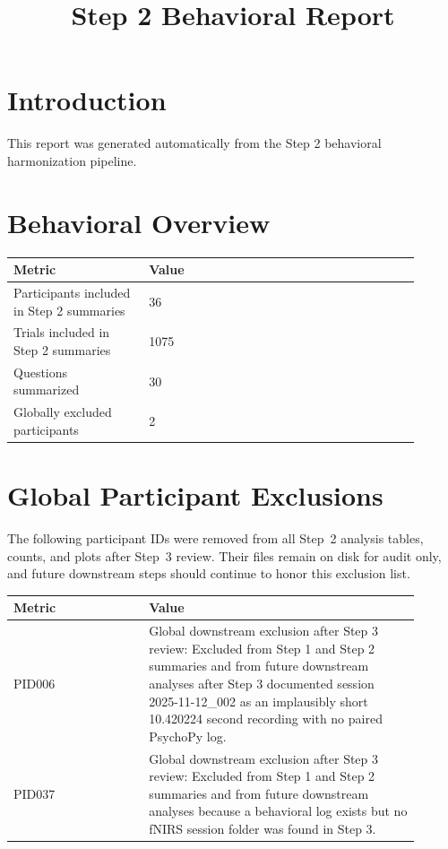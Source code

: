 \documentclass[11pt]{article}
\title{Step 2 Behavioral Report}
\date{}
\begin{document}
\maketitle
\section*{Introduction}
This report was generated automatically from the Step 2 behavioral harmonization pipeline.
\section*{Behavioral Overview}
\begin{tabular}{p{0.30\linewidth}p{0.60\linewidth}}
\toprule
Metric & Value\\
\midrule
Participants included in Step 2 summaries & 36\\
Trials included in Step 2 summaries & 1075\\
Questions summarized & 30\\
Globally excluded participants & 2\\
\bottomrule
\end{tabular}
\section*{Global Participant Exclusions}
The following participant IDs were removed from all Step~2 analysis tables, counts, and plots after Step~3 review. Their files remain on disk for audit only, and future downstream steps should continue to honor this exclusion list.
\begin{tabular}{p{0.30\linewidth}p{0.60\linewidth}}
\toprule
Metric & Value\\
\midrule
PID006 & Global downstream exclusion after Step 3 review: Excluded from Step 1 and Step 2 summaries and from future downstream analyses after Step 3 documented session 2025-11-12\_002 as an implausibly short 10.420224 second recording with no paired PsychoPy log.\\
PID037 & Global downstream exclusion after Step 3 review: Excluded from Step 1 and Step 2 summaries and from future downstream analyses because a behavioral log exists but no fNIRS session folder was found in Step 3.\\
\bottomrule
\end{tabular}



\end{document}
